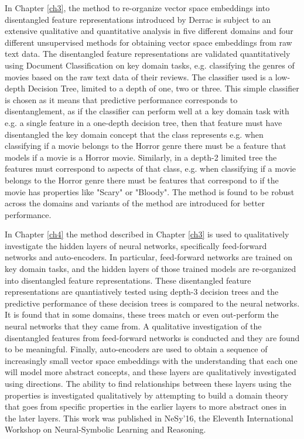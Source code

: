 In Chapter \ref{ch3}, the method to re-organize vector space embeddings into disentangled feature representations introduced by Derrac \cite{Derrac2015} is subject to an extensive qualitative and quantitative analysis in five different domains and four different unsupervised methods for obtaining vector space embeddings from raw text data. The disentangled feature representations are validated quantitatively using Document Classification on key domain tasks, e.g. classifying the genres of movies based on the raw text data of their reviews. The classifier used is a low-depth Decision Tree, limited to a depth of one, two or three. This simple classifier is chosen as it means that predictive performance corresponds to disentanglement, as if the classifier can perform well at a key domain task with e.g. a single feature in a one-depth decision tree, then that feature must have disentangled the key domain concept that the class represents  e.g. when classifying if a movie belongs to the Horror genre there must be a feature that models if a movie is a Horror movie. Similarly, in a depth-2 limited tree the features must correspond to aspects of that class, e.g. when classifying if a movie belongs to the Horror genre there must be features that correspond to if the movie has properties like "Scary" or "Bloody". The method is found to be robust across the domains and variants of the method are introduced for better performance.

In Chapter \ref{ch4} the method described in Chapter \ref{ch3} is used to qualitatively investigate the hidden layers of neural networks, specifically feed-forward networks and auto-encoders. In particular, feed-forward networks are trained on key domain tasks, and the hidden layers of those trained models are re-organized into disentangled feature representations. These disentangled feature representations are quantiatively tested using depth-3 decision trees and the predictive performance of these decision trees is compared to the neural networks. It is found that in some domains, these trees match or even out-perform the neural networks that they came from. A qualitative investigation of the disentangled features from feed-forward networks is conducted and they are found to be meaningful. Finally, auto-encoders are used to obtain a sequence of increasingly small vector space embeddings with the understanding that each one will model more abstract concepts, and these layers are qualitatively investigated using directions. The ability to find relationships between these layers using the properties is investigated qualitatively by attempting to build a domain theory that goes from specific properties in the earlier layers to more abstract ones in the later layers. This work was published in NeSy'16, the Eleventh International Workshop on Neural-Symbolic Learning and Reasoning.

